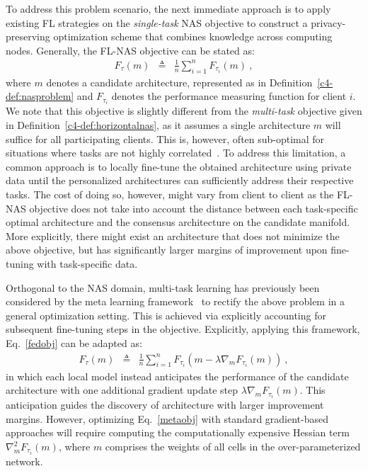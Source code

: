 To address this problem scenario, the next immediate approach is to  apply existing FL strategies on the \emph{single-task} NAS objective to construct a privacy-preserving optimization scheme that combines knowledge across computing nodes. Generally, the FL-NAS objective can be stated as:
\begin{eqnarray}
F_{\tau}(m) &\triangleq& \frac{1}{n}\sum_{i=1}^n F_{\tau_i}(m) \ ,
\label{fedobj}
\end{eqnarray}
where $m$ denotes a candidate architecture, represented as in Definition~\ref{c4-def:nasproblem} and $F_{\tau_i}$ denotes the performance measuring function for client $i$. We note that this objective is slightly different from the \emph{multi-task} objective given in  Definition~\ref{c4-def:horizontalnas}, as it assumes a single architecture 
$m$ will suffice for all participating clients. This is, however, often sub-optimal for situations where tasks are not highly correlated~\citep{lam2021model,hoang2020learning, yurochkin2019statistical}. To address this limitation, a common approach is to locally fine-tune the obtained architecture using private data until the personalized architectures can sufficiently address their respective tasks. The cost of doing so, however, might vary from client to client as the FL-NAS objective does not take into account the distance between each task-specific optimal architecture and the consensus architecture on the candidate manifold. More explicitly, there might exist an architecture that does not minimize the above objective, but has significantly larger margins of improvement upon fine-tuning with task-specific data.

Orthogonal to the NAS domain, multi-task learning has previously been considered by the meta learning framework~\cite{Finn17, Fallah20} to rectify the above problem in a general optimization setting. This is achieved via explicitly accounting for subsequent fine-tuning steps in the objective. Explicitly, applying this framework, Eq.~\eqref{fedobj} can be adapted as: 
\begin{eqnarray}
F_{\tau}(m) &\triangleq& \frac{1}{n}\sum_{i=1}^n F_{\tau_i}\left(m - \lambda\nabla_m F_{\tau_i}(m)\right) \ ,
\label{metaobj}
\end{eqnarray}
in which each local model instead anticipates the performance of the candidate architecture with one additional gradient update step $\lambda\nabla_m F_{\tau_i}(m)$. This anticipation guides the discovery of architecture with larger improvement margins. However, optimizing Eq.~\eqref{metaobj} with standard gradient-based approaches will require computing the computationally expensive Hessian term $\nabla^2_m F_{\tau_i}(m)$, where $m$ comprises the weights of all cells in the over-parameterized network. 


